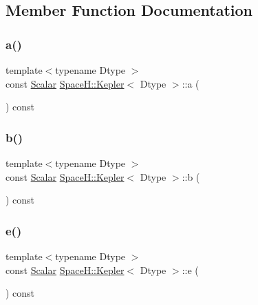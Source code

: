\subsection{Member Function Documentation}
\mbox{\label{struct_space_h_1_1_kepler_abf2934980df9d27a9705b891152e4f22}} 
\subsubsection{\texorpdfstring{a()}{a()}}
{\footnotesize\ttfamily template$<$typename Dtype $>$ \\
const \mbox{\hyperlink{struct_space_h_1_1_kepler_a19291f268209f594a96fb4828fa1a54c}{Scalar}} \mbox{\hyperlink{struct_space_h_1_1_kepler}{Space\+H\+::\+Kepler}}$<$ Dtype $>$\+::a (\begin{DoxyParamCaption}{ }\end{DoxyParamCaption}) const\hspace{0.3cm}{\ttfamily [inline]}}

\mbox{\label{struct_space_h_1_1_kepler_ab4c26acf95e92f8e0310bfd965b77562}} 
\subsubsection{\texorpdfstring{b()}{b()}}
{\footnotesize\ttfamily template$<$typename Dtype $>$ \\
const \mbox{\hyperlink{struct_space_h_1_1_kepler_a19291f268209f594a96fb4828fa1a54c}{Scalar}} \mbox{\hyperlink{struct_space_h_1_1_kepler}{Space\+H\+::\+Kepler}}$<$ Dtype $>$\+::b (\begin{DoxyParamCaption}{ }\end{DoxyParamCaption}) const\hspace{0.3cm}{\ttfamily [inline]}}

\mbox{\label{struct_space_h_1_1_kepler_a17a4205719ad64fe7a3b05f86cab7486}} 
\subsubsection{\texorpdfstring{e()}{e()}}
{\footnotesize\ttfamily template$<$typename Dtype $>$ \\
const \mbox{\hyperlink{struct_space_h_1_1_kepler_a19291f268209f594a96fb4828fa1a54c}{Scalar}} \mbox{\hyperlink{struct_space_h_1_1_kepler}{Space\+H\+::\+Kepler}}$<$ Dtype $>$\+::e (\begin{DoxyParamCaption}{ }\end{DoxyParamCaption}) const\hspace{0.3cm}{\ttfamily [inline]}}

